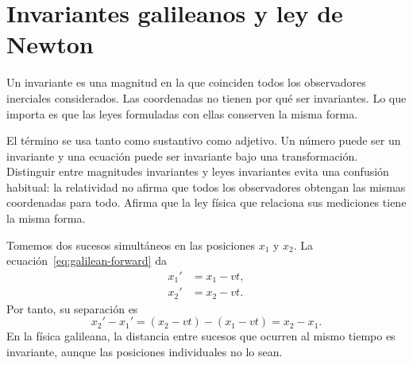 \begin{classroomqa}\end{classroomqa}

\section{Invariantes galileanos y ley de Newton}

Un invariante es una magnitud en la que coinciden todos los observadores inerciales considerados. Las coordenadas no tienen por qué ser invariantes. Lo que importa es que las leyes formuladas con ellas conserven la misma forma.

El término se usa tanto como sustantivo como adjetivo. Un número puede ser un invariante y una ecuación puede ser invariante bajo una transformación. Distinguir entre magnitudes invariantes y leyes invariantes evita una confusión habitual: la relatividad no afirma que todos los observadores obtengan las mismas coordenadas para todo. Afirma que la ley física que relaciona sus mediciones tiene la misma forma.

Tomemos dos sucesos simultáneos en las posiciones \(x_1\) y \(x_2\). La ecuación~\eqref{eq:galilean-forward} da
\begin{align}
x_1'&=x_1-vt,\\
x_2'&=x_2-vt.
\end{align}
Por tanto, su separación es
\begin{equation}
x_2'-x_1'=(x_2-vt)-(x_1-vt)=x_2-x_1.
\end{equation}
En la física galileana, la distancia entre sucesos que ocurren al mismo tiempo es invariante, aunque las posiciones individuales no lo sean.

